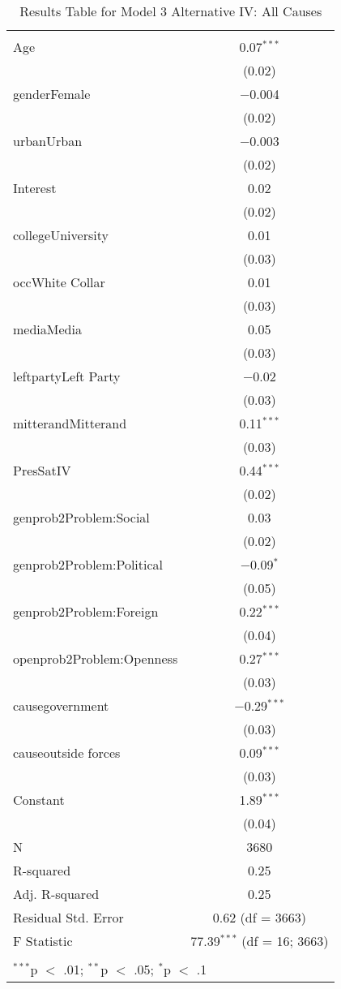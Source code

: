 
\begin{table}[!htbp] \centering 
  \caption{Results Table for Model 3 Alternative IV: All Causes} 
  \label{} 
\footnotesize 
\begin{tabular}{@{\extracolsep{5pt}}lc} 
\\[-1.8ex]\hline \\[-1.8ex] 
\hline \\[-1.8ex] 
 Age & 0.07$^{***}$ \\ 
  & (0.02) \\ 
  genderFemale & $-$0.004 \\ 
  & (0.02) \\ 
  urbanUrban & $-$0.003 \\ 
  & (0.02) \\ 
  Interest & 0.02 \\ 
  & (0.02) \\ 
  collegeUniversity & 0.01 \\ 
  & (0.03) \\ 
  occWhite Collar & 0.01 \\ 
  & (0.03) \\ 
  mediaMedia & 0.05 \\ 
  & (0.03) \\ 
  leftpartyLeft Party & $-$0.02 \\ 
  & (0.03) \\ 
  mitterandMitterand & 0.11$^{***}$ \\ 
  & (0.03) \\ 
  PresSatIV & 0.44$^{***}$ \\ 
  & (0.02) \\ 
  genprob2Problem:Social & 0.03 \\ 
  & (0.02) \\ 
  genprob2Problem:Political & $-$0.09$^{*}$ \\ 
  & (0.05) \\ 
  genprob2Problem:Foreign & 0.22$^{***}$ \\ 
  & (0.04) \\ 
  openprob2Problem:Openness & 0.27$^{***}$ \\ 
  & (0.03) \\ 
  causegovernment & $-$0.29$^{***}$ \\ 
  & (0.03) \\ 
  causeoutside forces & 0.09$^{***}$ \\ 
  & (0.03) \\ 
  Constant & 1.89$^{***}$ \\ 
  & (0.04) \\ 
 N & 3680 \\ 
R-squared & 0.25 \\ 
Adj. R-squared & 0.25 \\ 
Residual Std. Error & 0.62 (df = 3663) \\ 
F Statistic & 77.39$^{***}$ (df = 16; 3663) \\ 
\hline \\[-1.8ex] 
\multicolumn{2}{l}{$^{***}$p $<$ .01; $^{**}$p $<$ .05; $^{*}$p $<$ .1} \\ 
\end{tabular} 
\end{table} 
